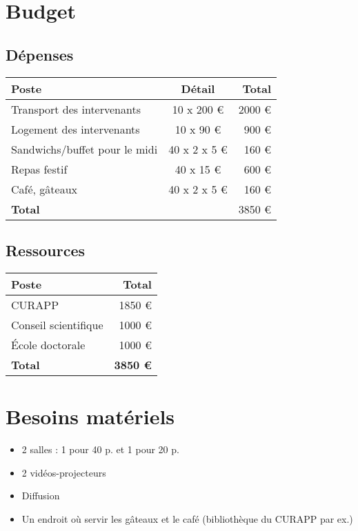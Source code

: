 \documentclass[11pt]{article}
\begin{document}
\section{Budget}

\subsection{Dépenses}

\begin{longtable}{lcr}
Poste & Détail & Total \\
\hline
\endhead
Transport des intervenants     & 10 x 200 €     & 2000 € \\
Logement des intervenants     & 10 x 90 €        & 900 € \\ %
Sandwichs/buffet pour le midi & 40 x 2 x 5 €    & 160 € \\
Repas festif                                 & 40  x 15 €      & 600 € \\
Café, gâteaux                               & 40 x 2 x 5 €   & 160 € \\
\hline
\textbf{Total}                                &                         & 3850 € \\
\end{longtable}

\subsection{Ressources}

\begin{longtable}{lr}
Poste & Total \\
\hline
\endhead

CURAPP & 1850 € \\
Conseil scientifique & 1000 € \\
École doctorale & 1000 € \\
\hline
\textbf{Total} & \textbf{3850 €} \\

\end{longtable}


\section{Besoins matériels}
\begin{itemize}
\item 2 salles : 1 pour 40 p. et 1 pour 20 p.
\item 2  vidéos-projecteurs
\item Diffusion
\item Un endroit où servir les gâteaux et le café (bibliothèque du CURAPP par ex.) 
\end{itemize}
\end{document}
